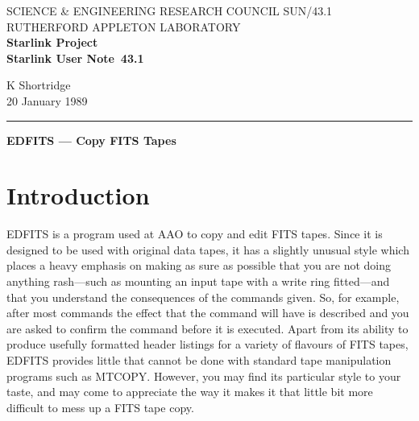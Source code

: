 \pagestyle{myheadings}

\newcommand{\stardoccategory}  {Starlink User Note}
\newcommand{\stardocinitials}  {SUN}
\newcommand{\stardocnumber}    {43.1}
\newcommand{\stardocauthors}   {K Shortridge}
\newcommand{\stardocdate}      {20 January 1989}
\newcommand{\stardoctitle}     {EDFITS --- Copy FITS Tapes}

\newcommand{\stardocname}{\stardocinitials /\stardocnumber}
\renewcommand{\_}{{\tt\char'137}}
\markright{\stardocname}
\setlength{\textwidth}{160mm}
\setlength{\textheight}{240mm}
\setlength{\topmargin}{-5mm}
\setlength{\oddsidemargin}{0mm}
\setlength{\evensidemargin}{0mm}
\setlength{\parindent}{0mm}
\setlength{\parskip}{\medskipamount}
\setlength{\unitlength}{1mm}


\thispagestyle{empty}
SCIENCE \& ENGINEERING RESEARCH COUNCIL \hfill \stardocname\\
RUTHERFORD APPLETON LABORATORY\\
{\large\bf Starlink Project\\}
{\large\bf \stardoccategory\ \stardocnumber}
\begin{flushright}
\stardocauthors\\
\stardocdate
\end{flushright}
\vspace{-4mm}
\rule{\textwidth}{0.5mm}
\vspace{5mm}
\begin{center}
{\Large\bf \stardoctitle}
\end{center}
\vspace{5mm}

\section{Introduction}

EDFITS is a program used at AAO to copy and edit FITS tapes.  Since it is
designed to be used with original data tapes, it has a slightly unusual
style which places a heavy emphasis on making as sure as possible that you
are not doing anything rash---such as mounting an input tape with a write 
ring fitted---and that you understand the consequences of the commands
given.  So, for example, after most commands the effect that the command will
have is described and you are asked to confirm the command before it is 
executed.  Apart from its ability to produce usefully formatted header listings
for a variety of flavours of FITS tapes, EDFITS provides little that cannot
be done with standard tape manipulation programs such as MTCOPY.  However,
you may find its particular style to your taste, and may come to appreciate
the way it makes it that little bit more difficult to mess up a FITS tape
copy.

